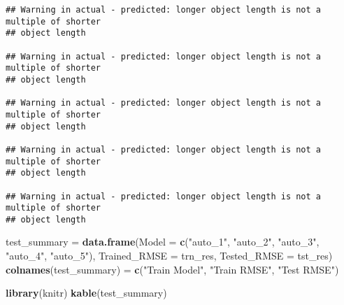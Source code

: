 \documentclass[
]{article}
\newenvironment{Shaded}{\begin{snugshade}}{\end{snugshade}}
\newcommand{\DataTypeTok}[1]{\textcolor[rgb]{0.13,0.29,0.53}{#1}}
\newcommand{\DecValTok}[1]{\textcolor[rgb]{0.00,0.00,0.81}{#1}}
\newcommand{\KeywordTok}[1]{\textcolor[rgb]{0.13,0.29,0.53}{\textbf{#1}}}
\newcommand{\NormalTok}[1]{#1}
\newcommand{\OperatorTok}[1]{\textcolor[rgb]{0.81,0.36,0.00}{\textbf{#1}}}
\newcommand{\StringTok}[1]{\textcolor[rgb]{0.31,0.60,0.02}{#1}}
\begin{document}
\begin{Shaded}
\end{Shaded}

\begin{verbatim}
## Warning in actual - predicted: longer object length is not a multiple of shorter
## object length

## Warning in actual - predicted: longer object length is not a multiple of shorter
## object length

## Warning in actual - predicted: longer object length is not a multiple of shorter
## object length

## Warning in actual - predicted: longer object length is not a multiple of shorter
## object length

## Warning in actual - predicted: longer object length is not a multiple of shorter
## object length
\end{verbatim}

\begin{Shaded}
\begin{Highlighting}[]
\NormalTok{test_summary =}\StringTok{ }\KeywordTok{data.frame}\NormalTok{(}\DataTypeTok{Model =} \KeywordTok{c}\NormalTok{(}\StringTok{"auto_1"}\NormalTok{, }\StringTok{"auto_2"}\NormalTok{, }\StringTok{"auto_3"}\NormalTok{, }\StringTok{"auto_4"}\NormalTok{, }\StringTok{"auto_5"}\NormalTok{),}
                          \DataTypeTok{Trained_RMSE =}\NormalTok{ trn_res, }
                          \DataTypeTok{Tested_RMSE =}\NormalTok{ tst_res)}
\KeywordTok{colnames}\NormalTok{(test_summary) =}\StringTok{ }\KeywordTok{c}\NormalTok{(}\StringTok{"Train Model"}\NormalTok{, }\StringTok{"Train RMSE"}\NormalTok{, }\StringTok{"Test RMSE"}\NormalTok{)}

\KeywordTok{library}\NormalTok{(knitr)}
\KeywordTok{kable}\NormalTok{(test_summary)}
\end{Highlighting}
\end{Shaded}
\end{document}
